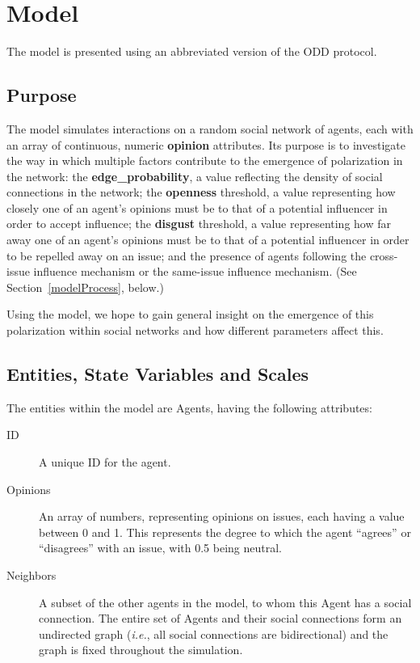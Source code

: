 \section{Model}

The model is presented using an abbreviated version of the ODD
protocol\cite{grimm_standard_2006}.

\subsection{Purpose}


The model simulates interactions on a random social network of agents, each
with an array of continuous, numeric \textbf{opinion} attributes. Its purpose
is to investigate the way in which multiple factors contribute to the emergence of
polarization in the network: the \textbf{edge\_probability}, a value reflecting
the density of social connections in the network; the \textbf{openness} threshold, a
value representing how closely one of an agent's opinions must be to that of a
potential influencer in order to accept influence; the \textbf{disgust} threshold, a value representing how far away one of an agent's opinions must be to that of a potential influencer in order to be repelled away on an issue; and the presence of agents following the cross-issue influence mechanism or the same-issue influence mechanism. (See
Section~\ref{modelProcess}, below.)

Using the model, we hope to gain general insight on the emergence of this
polarization within social networks and how different parameters affect this.

\subsection{Entities, State Variables and Scales}

The entities within the model are Agents, having the following attributes:

\begin{description}
\item[ID] A unique ID for the agent.
\item[Opinions] An array of numbers, representing opinions on issues, each
having a value between 0 and 1. This represents the degree to which the agent
``agrees'' or ``disagrees'' with an issue, with 0.5 being neutral.
\item[Neighbors] A subset of the other agents in the model, to whom this Agent
has a social connection. The entire set of Agents and their social connections
form an undirected graph (\textit{i.e.}, all social connections are
bidirectional) and the graph is fixed throughout the simulation.

\end{description}


